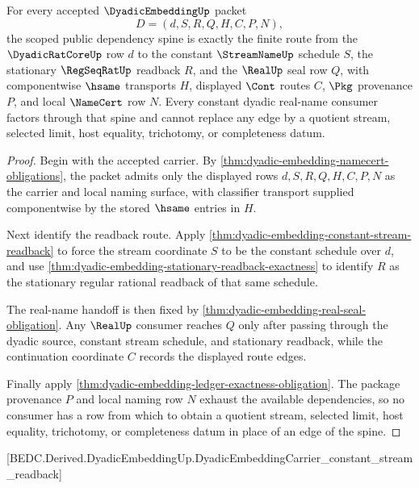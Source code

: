 \begin{theorem}
\label{thm:dyadic-embedding-scoped-dependency-spine}
For every accepted $\DyadicEmbeddingUp$ packet
$$
D=(d,S,R,Q,H,C,P,N),
$$
the scoped public dependency spine is exactly the finite route from the $\DyadicRatCoreUp$ row $d$ to the constant $\StreamNameUp$ schedule $S$, the stationary $\RegSeqRatUp$ readback $R$, and the $\RealUp$ seal row $Q$, with componentwise $\hsame$ transports $H$, displayed $\Cont$ routes $C$, $\Pkg$ provenance $P$, and local $\NameCert$ row $N$. Every constant dyadic real-name consumer factors through that spine and cannot replace any edge by a quotient stream, selected limit, host equality, trichotomy, or completeness datum.
\end{theorem}
\begin{proof}
Begin with the accepted carrier. By \autoref{thm:dyadic-embedding-namecert-obligations}, the packet admits only the displayed rows $d,S,R,Q,H,C,P,N$ as the carrier and local naming surface, with classifier transport supplied componentwise by the stored $\hsame$ entries in $H$.

Next identify the readback route. Apply \autoref{thm:dyadic-embedding-constant-stream-readback} to force the stream coordinate $S$ to be the constant schedule over $d$, and use \autoref{thm:dyadic-embedding-stationary-readback-exactness} to identify $R$ as the stationary regular rational readback of that same schedule.

The real-name handoff is then fixed by \autoref{thm:dyadic-embedding-real-seal-obligation}. Any $\RealUp$ consumer reaches $Q$ only after passing through the dyadic source, constant stream schedule, and stationary readback, while the continuation coordinate $C$ records the displayed route edges.

Finally apply \autoref{thm:dyadic-embedding-ledger-exactness-obligation}. The package provenance $P$ and local naming row $N$ exhaust the available dependencies, so no consumer has a row from which to obtain a quotient stream, selected limit, host equality, trichotomy, or completeness datum in place of an edge of the spine.
\end{proof}

[BEDC.Derived.DyadicEmbeddingUp.DyadicEmbeddingCarrier\_constant\_stream\_readback]

